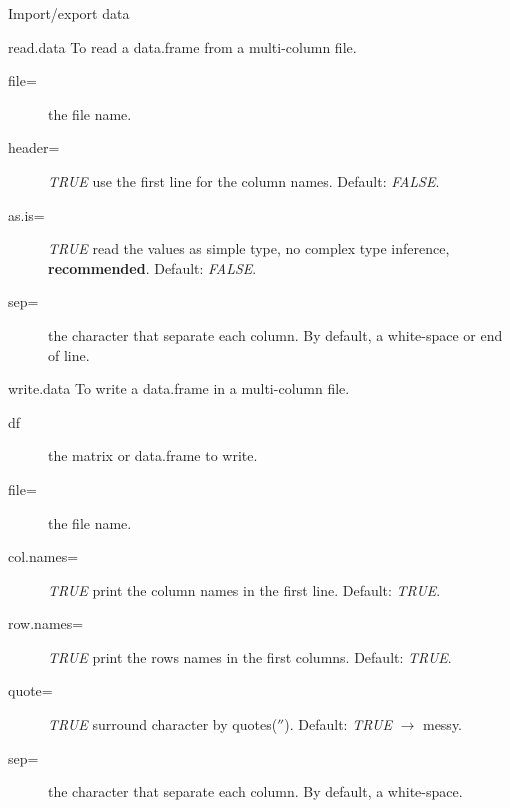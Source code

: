\documentclass[10pt]{beamer}
\begin{document}

\begin{frame}[shrink=10]{Import/export data}
  \begin{block}{{\sf read.data}}
    To read a {\sf data.frame} from a multi-column file.
    \begin{description}
    \item[file=] the file name.
    \item[header=] {\it TRUE} use the first line for the column names. Default: {\it FALSE}.
    \item[as.is=] {\it TRUE} read the values as simple type, no complex type inference, {\bf recommended}. Default: {\it FALSE}. 
    \item[sep=] the character that separate each column. By default, a white-space or end of line.
    \end{description}
  \end{block}
  \begin{block}{{\sf write.data}}
    To write a {\sf data.frame} in a multi-column file.
    \begin{description}
    \item[df] the {\sf matrix} or {\sf data.frame} to write.
    \item[file=] the file name.
    \item[col.names=] {\it TRUE} print the column names in the first line. Default: {\it TRUE}.
    \item[row.names=] {\it TRUE} print the rows names in the first columns. Default: {\it TRUE}.
    \item[quote=] {\it TRUE} surround {\sf character} by quotes($''$). Default: {\it TRUE} $\rightarrow$ messy. 
    \item[sep=] the character that separate each column. By default, a white-space.
    \end{description}
  \end{block}
\end{frame}

\end{document}
